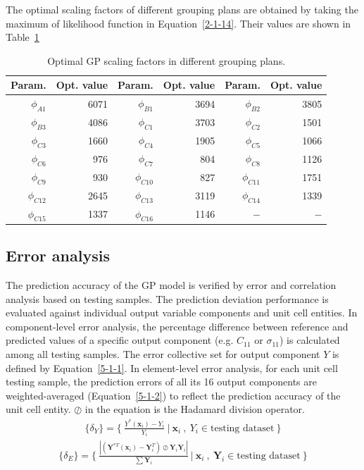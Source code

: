 \documentclass[12pt]{extbook}
\begin{document}
The optimal scaling factors of different grouping plans are obtained by taking the maximum of likelihood function in Equation~\ref{2-1-14}. Their values are shown in Table~\ref{scaling_factor}
\begin{table}[h]
\centering
\caption{Optimal GP scaling factors in different grouping plans.}
\begin{tabular}{rr|rr|rr}
\hline\hline
Param. & Opt. value & Param. & Opt. value & Param. & Opt. value\\
\hline
$\phi_{A1}$ & 6071 & $\phi_{B1}$ & 3694 & $\phi_{B2}$ & 3805\\
$\phi_{B3}$ & 4086 & $\phi_{C1}$ & 3703 & $\phi_{C2}$ & 1501\\
$\phi_{C3}$ & 1660 & $\phi_{C4}$ & 1905 & $\phi_{C5}$ & 1066\\
$\phi_{C6}$ & 976 & $\phi_{C7}$ & 804 & $\phi_{C8}$ & 1126\\
$\phi_{C9}$ & 930 & $\phi_{C10}$ & 827 & $\phi_{C11}$ & 1751\\
$\phi_{C12}$ & 2645 & $\phi_{C13}$ & 3119 & $\phi_{C14}$ & 1339\\
$\phi_{C15}$ & 1337 & $\phi_{C16}$ & 1146 & $-$ & $-$\\
\hline\hline
\end{tabular}
\label{scaling_factor}
\end{table}

\subsection{Error analysis}

The prediction accuracy of the GP model is verified by error and correlation analysis based on testing samples. The prediction deviation performance is evaluated against individual output variable components and unit cell entities. In component-level error analysis, the percentage difference between reference and predicted values of a specific output component (e.g. $C_{11}$ or $\sigma_{11}$) is calculated among all testing samples. The error collective set for output component $Y$ is defined by Equation~\ref{5-1-1}. In element-level error analysis, for each unit cell testing sample, the prediction errors of all its 16 output components are weighted-averaged (Equation~\ref{5-1-2}) to reflect the prediction accuracy of the unit cell entity. $\oslash$ in the equation is the Hadamard division operator.
\begin{equation}
\begin{split}
\{\delta_{Y}\} = \{~\frac{Y^*(\bm{x}_{i}) - Y_i}{Y_i}~|~\bm{x}_i~,~Y_i \in \text{testing dataset}~\}
\end{split}
\label{5-1-1}
\end{equation}
\begin{equation}
\begin{split}
\{\delta_E\} = \{~\frac
{|(\bm{Y}^{*T}(\bm{x}_{i}) - \bm{Y}^T_{i})\oslash\bm{Y}_i\bm{Y}_i|}{\sum\bm{Y}_{i}}~|~\bm{x}_i~,~\bm{Y}_i \in \text{testing dataset}~\}
\end{split}
\label{5-1-2}
\end{equation}
\end{document}
